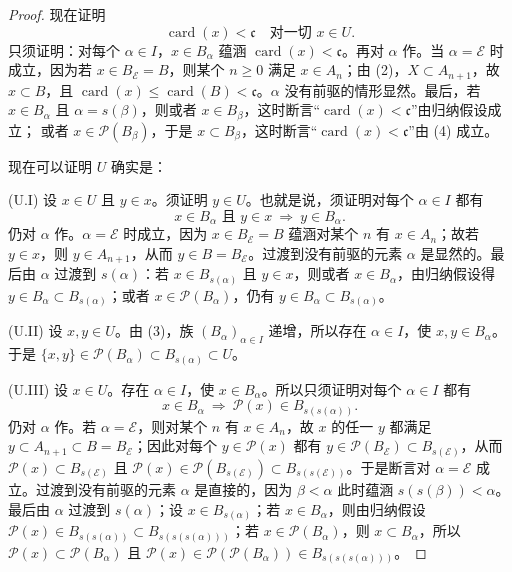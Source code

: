 \begin{proof}
现在证明
\[
 \operatorname{card}(x)<\mathfrak{c}\quad\text{对一切 }x\in U. \tag{5}
\]
只须证明：对每个 $\alpha\in I$，$x\in B_\alpha$ 蕴涵 $\operatorname{card}(x)<\mathfrak{c}$。再对 $\alpha$ 作。当 $\alpha=\mathscr E$ 时成立，因为若 $x\in B_{\mathscr E}=B$，则某个 $n\geq0$ 满足 $x\in A_n$；由 (2)，$X\subset A_{n+1}$，故 $x\subset B$，且 $\operatorname{card}(x)\leq\operatorname{card}(B)<\mathfrak{c}$。$\alpha$ 没有前驱的情形显然。最后，若 $x\in B_\alpha$ 且 $\alpha=s(\beta)$，则或者 $x\in B_\beta$，这时断言“$\operatorname{card}(x)<\mathfrak{c}$”由归纳假设成立；
或者 $x\in\mathcal P(B_\beta)$，于是 $x\subset B_\beta$，这时断言“$\operatorname{card}(x)<\mathfrak{c}$”由 (4) 成立。

现在可以证明 $U$ 确实是：

(U.I) 设 $x\in U$ 且 $y\in x$。须证明 $y\in U$。也就是说，须证明对每个 $\alpha\in I$ 都有
\[
 x\in B_\alpha\text{ 且 }y\in x\ \Longrightarrow\ y\in B_\alpha.
\]
仍对 $\alpha$ 作。$\alpha=\mathscr E$ 时成立，因为 $x\in B_{\mathscr E}=B$ 蕴涵对某个 $n$ 有 $x\in A_n$；故若 $y\in x$，则 $y\in A_{n+1}$，从而 $y\in B=B_{\mathscr E}$。过渡到没有前驱的元素 $\alpha$ 是显然的。最后由 $\alpha$ 过渡到 $s(\alpha)$：若 $x\in B_{s(\alpha)}$ 且 $y\in x$，则或者 $x\in B_\alpha$，由归纳假设得 $y\in B_\alpha\subset B_{s(\alpha)}$；或者 $x\in\mathcal P(B_\alpha)$，仍有 $y\in B_\alpha\subset B_{s(\alpha)}$。

(U.II) 设 $x,y\in U$。由 (3)，族 $(B_\alpha)_{\alpha\in I}$ 递增，所以存在 $\alpha\in I$，使 $x,y\in B_\alpha$。于是 $\{x,y\}\in\mathcal P(B_\alpha)\subset B_{s(\alpha)}\subset U$。

(U.III) 设 $x\in U$。存在 $\alpha\in I$，使 $x\in B_\alpha$。所以只须证明对每个 $\alpha\in I$ 都有
\[
 x\in B_\alpha\ \Longrightarrow\ \mathcal P(x)\in B_{s(s(\alpha))}.
\]
仍对 $\alpha$ 作。若 $\alpha=\mathscr E$，则对某个 $n$ 有 $x\in A_n$，故 $x$ 的任一 $y$ 都满足 $y\subset A_{n+1}\subset B=B_{\mathscr E}$；因此对每个 $y\in\mathcal P(x)$ 都有 $y\in\mathcal P(B_{\mathscr E})\subset B_{s(\mathscr E)}$，从而 $\mathcal P(x)\subset B_{s(\mathscr E)}$ 且 $\mathcal P(x)\in\mathcal P(B_{s(\mathscr E)})\subset B_{s(s(\mathscr E))}$。于是断言对 $\alpha=\mathscr E$ 成立。过渡到没有前驱的元素 $\alpha$ 是直接的，因为 $\beta<\alpha$ 此时蕴涵 $s(s(\beta))<\alpha$。最后由 $\alpha$ 过渡到 $s(\alpha)$；设 $x\in B_{s(\alpha)}$；若 $x\in B_\alpha$，则由归纳假设 $\mathcal P(x)\in B_{s(s(\alpha))}\subset B_{s(s(s(\alpha)))}$；若 $x\in\mathcal P(B_\alpha)$，则 $x\subset B_\alpha$，所以 $\mathcal P(x)\subset\mathcal P(B_\alpha)$ 且 $\mathcal P(x)\in\mathcal P(\mathcal P(B_\alpha))\in B_{s(s(s(\alpha)))}$。


\end{proof}
